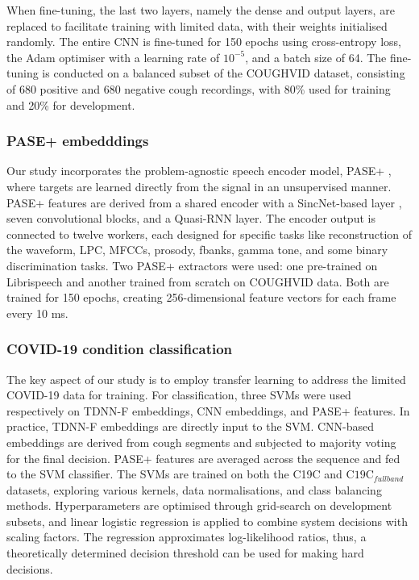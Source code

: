 When fine-tuning, the last two layers, namely the dense and output layers, are replaced to facilitate training with limited data, with their weights initialised randomly. The entire \ac{CNN} is fine-tuned for 150 epochs using cross-entropy loss, the Adam optimiser with a learning rate of $10^{-5}$, and a batch size of 64. The fine-tuning is conducted on a balanced subset of the COUGHVID dataset, consisting of 680 positive and 680 negative cough recordings, with 80\% used for training and 20\% for development.

\subsubsection{PASE+ embedddings}
Our study incorporates the problem-agnostic speech encoder model, \ac{PASE}+ \cite{Pascual2019,Ravanelli2020}, where targets are learned directly from the
signal in an unsupervised manner. \ac{PASE}+ features are derived from a shared encoder with a SincNet-based layer \cite{Sincnet}, seven convolutional blocks, and a Quasi-\ac{RNN} layer. The encoder output is connected to twelve workers, each designed for specific tasks like reconstruction of the waveform, \ac{LPC}, \acp{MFCC}, prosody, \ac{fbanks}, gamma tone, and some binary discrimination tasks. Two \ac{PASE}+ extractors were used: one pre-trained on Librispeech \cite{librispeech} and another trained from scratch on COUGHVID data. Both are trained for 150 epochs, creating 256-dimensional feature vectors for each frame every 10 ms.

\subsubsection{COVID-19 condition classification}
The key aspect of our study is to employ transfer learning to address the limited COVID-19 data for training. For classification, three \acp{SVM} were used respectively on \ac{TDNN-F} embeddings, \ac{CNN} embeddings, and \ac{PASE}+ features. In practice, \ac{TDNN-F} embeddings are directly input to the \ac{SVM}. \ac{CNN}-based embeddings are derived from cough segments and subjected to majority voting for the final decision. \ac{PASE}+ features are averaged across the sequence and fed to the \ac{SVM} classifier. The \acp{SVM} are trained on both the C19C and $\text{C19C}_{fullband}$ datasets, exploring various kernels, data normalisations, and class balancing methods. Hyperparameters are optimised through grid-search on development subsets, and linear logistic regression is applied to combine system decisions with scaling factors. The regression approximates log-likelihood ratios, thus, a theoretically determined decision threshold can be used for making hard decisions.

